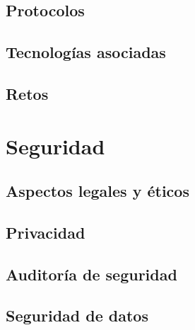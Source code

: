 {\newpage


\subsection{Protocolos}



\subsection{Tecnologías asociadas}


\subsection{Retos}



\section{Seguridad}

\subsection{Aspectos legales y éticos}


\subsection{Privacidad}


\subsection{Auditoría de seguridad}


\subsection{Seguridad de datos}

}